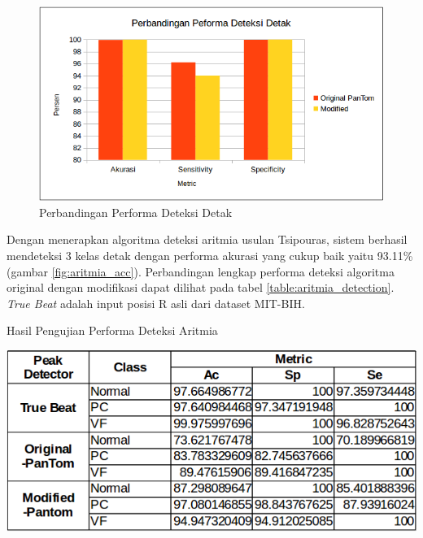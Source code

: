 \documentclass[]{indojc_single}
\begin{document}
\begin{figure}[H]
\centerline{\includegraphics[scale=0.41]{images/beat_perform.png}}
\caption{Perbandingan Performa Deteksi Detak}
\label{fig:beat_perform}
\end{figure}

Dengan menerapkan algoritma deteksi aritmia usulan Tsipouras, sistem berhasil mendeteksi 3 kelas detak dengan performa akurasi yang cukup baik yaitu 93.11\% (gambar \ref{fig:aritmia_acc}). Perbandingan lengkap performa deteksi algoritma original dengan modifikasi dapat dilihat pada tabel \ref{table:aritmia_detection}. \textit{True Beat} adalah input posisi R asli dari dataset MIT-BIH.

\begin{table}[H]
	\begin{center}
	\caption{Hasil Pengujian Performa Deteksi Aritmia}
	\includegraphics[scale=0.55]{images/aritmia_detection.png}	
	\label{table:aritmia_detection}
	\end{center}
\end{table}
\end{document}
